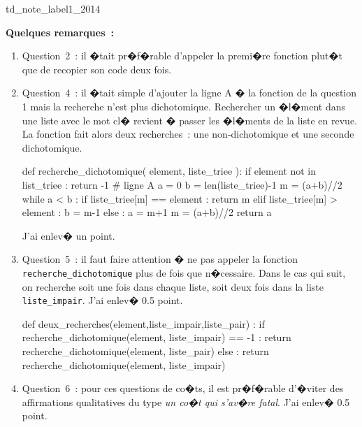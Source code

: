 \begin{xdemoexonot}{td_note_label1_2014}


\textbf{Quelques remarques~:}

\begin{enumerate}
\item Question~2~: il �tait pr�f�rable d'appeler la premi�re fonction plut�t que de recopier son code deux fois.
\item Question~4~: il �tait simple d'ajouter la ligne A � la fonction de la question 1 mais la recherche n'est plus dichotomique. Rechercher un �l�ment dans une liste avec le mot cl�  revient � passer les �l�ments de la liste en revue. La fonction fait alors deux recherches~: une non-dichotomique et une seconde dichotomique. \label{rem2014_q4_ex1}

\begin{verbatimx}
def recherche_dichotomique( element, liste_triee ):
    if element not in list_triee : return -1 # ligne A
    a = 0
    b = len(liste_triee)-1
    m = (a+b)//2
    while a < b :
        if liste_triee[m] == element :
            return m
        elif liste_triee[m] > element :
            b = m-1
        else :
            a = m+1
        m = (a+b)//2
    return a
\end{verbatimx}

J'ai enlev� un point.

\item Question~5~: il faut faire attention � ne pas appeler la fonction \texttt{recherche\_dichotomique} plus de fois que n�cessaire. Dans le cas qui suit, on recherche soit une fois dans chaque liste, soit deux fois dans la liste \texttt{liste\_impair}. J'ai enlev� 0.5 point.

\begin{verbatimx}
def deux_recherches(element,liste_impair,liste_pair) :
    if recherche_dichotomique(element, liste_impair) == -1 : 
       return recherche_dichotomique(element, liste_pair)
    else : return recherche_dichotomique(element, liste_impair)
\end{verbatimx}


\item Question~6~: pour ces questions de co�ts, il est pr�f�rable d'�viter des affirmations qualitatives du type \textit{un co�t qui s'av�re fatal}. J'ai enlev� 0.5 point.

\end{enumerate}

\end{xdemoexonot}
\fi



